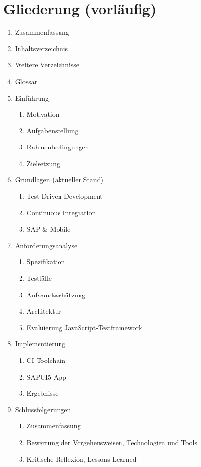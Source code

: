 \documentclass[10pt, a4paper]{article}
\begin{document}
\section{Gliederung (vorläufig)}
\begin{enumerate}
  \item Zusammenfassung
  \item Inhaltsverzeichnis
  \item Weitere Verzeichnisse
  \item Glossar
  \item Einführung
  \begin{enumerate}
    \item Motivation
    \item Aufgabenstellung
    \item Rahmenbedingungen
    \item Zielsetzung
  \end{enumerate}
  \item Grundlagen (aktueller Stand)
  \begin{enumerate}
    \item Test Driven Development
    \item Continuous Integration
    \item SAP \& Mobile
  \end{enumerate}
  \item Anforderungsanalyse
    \begin{enumerate}
    \item Spezifikation
    \item Testfälle
    \item Aufwandsschätzung
    \item Architektur
    \item Evaluierung JavaScript-Testframework
  \end{enumerate}
  \item Implementierung
  \begin{enumerate}
    \item CI-Toolchain
    \item SAPUI5-App
    \item Ergebnisse
  \end{enumerate}
  \item Schlussfolgerungen
  \begin{enumerate}
    \item Zusammenfassung
    \item Bewertung der Vorgehensweisen, Technologien und Tools
    \item Kritische Reflexion, Lessons Learned

\end{enumerate}
\end{enumerate}
\end{document}
